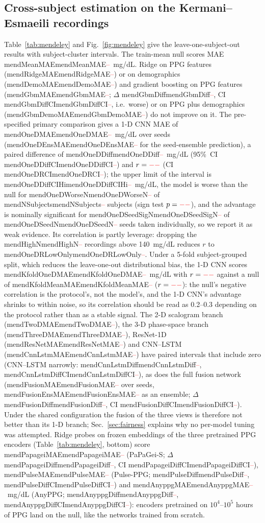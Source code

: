\documentclass[journal]{IEEEtran}
\newcommand{\m}[1]{\ifcsname #1\endcsname\csname #1\endcsname\else\textcolor{red}{--}\fi}
\begin{document}
\subsection{Cross-subject estimation on the Kermani--Esmaeili recordings}
\label{sec:mendeley_results}
Table~\ref{tab:mendeley} and Fig.~\ref{fig:mendeley} give the
leave-one-subject-out results with subject-cluster intervals.  The train-mean
null scores MAE \m{mendMeanMAE}~mg/dL.  Ridge on PPG features
(\m{mendRidgeMAE}) or on demographics (\m{mendDemoMAE}) and gradient
boosting on PPG features (\m{mendGbmMAE}; $\Delta$ \m{mendGbmDiff}, CI
\m{mendGbmDiffCI}, i.e.\ worse) or on PPG plus demographics
(\m{mendGbmDemoMAE}) do not improve on it.  The pre-specified primary comparison
gives a 1-D CNN MAE of \m{mendOneDMAE}~mg/dL over seeds
(\m{mendOneDEnsMAE} for the seed-ensemble prediction), a paired difference
of \m{mendOneDDiff}~mg/dL (95\%~CI \m{mendOneDDiffCI}) and $r=\m{mendOneDR}$
(CI \m{mendOneDRCI}); the upper limit of the interval is
\m{mendOneDDiffCIHi}~mg/dL, the model is worse than the null for
\m{mendOneDWorseN} of \m{mendNSubjects} subjects (sign test
$p=\m{mendOneDSignP}$), and the advantage is nominally significant for
\m{mendOneDSeedSigN} of \m{mendOneDSeedN} seeds taken individually, so we
report it as weak evidence.  Its correlation is partly leverage: dropping the \m{mendHighN}
recordings above 140~mg/dL reduces $r$ to \m{mendOneDRLowOnly}.  Under a
5-fold subject-grouped split, which reduces the leave-one-out
distributional bias, the 1-D CNN scores \m{mendKfoldOneDMAE}~mg/dL with
$r=\m{mendKfoldOneDR}$ against a null of \m{mendKfoldMeanMAE}
($r=\m{mendKfoldMeanR}$): the null's negative correlation is the
protocol's, not the model's, and the 1-D CNN's advantage shrinks to
within noise, so its correlation should be read as 0.2--0.3 depending on
the protocol rather than as a stable signal.  The 2-D
scalogram branch (\m{mendTwoDMAE}), the 3-D phase-space branch
(\m{mendThreeDMAE}), ResNet-1D (\m{mendResNetMAE}) and CNN--LSTM
(\m{mendCnnLstmMAE}) have paired intervals that include zero (CNN--LSTM
narrowly: \m{mendCnnLstmDiff}, \m{mendCnnLstmDiffCI}), as does the full fusion
network (\m{mendFusionMAE} over seeds, \m{mendFusionEnsMAE} as an ensemble;
$\Delta$ \m{mendFusionDiff}, CI \m{mendFusionDiffCI}).  Under the shared
configuration the fusion of the three views is therefore not better than
its 1-D branch; Sec.~\ref{sec:fairness} explains why no per-model tuning
was attempted.  Ridge probes on frozen embeddings of the three pretrained
PPG encoders (Table~\ref{tab:mendeley}, bottom) score \m{mendPapageiMAE}
(PaPaGei-S; $\Delta$ \m{mendPapageiDiff}, CI \m{mendPapageiDiffCI}),
\m{mendPulseMAE} (Pulse-PPG; \m{mendPulseDiff}, \m{mendPulseDiffCI}) and
\m{mendAnyppgMAE}~mg/dL (AnyPPG; \m{mendAnyppgDiff}, \m{mendAnyppgDiffCI}):
encoders pretrained on $10^4$--$10^5$ hours of PPG land on the null, like
the networks trained from scratch.
\end{document}
